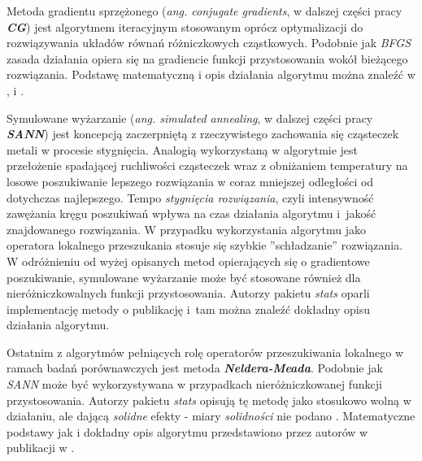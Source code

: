 \par
Metoda gradientu sprzężonego (\emph{ang. conjugate gradients}, w dalszej części pracy \emph{\textbf{CG}}) jest algorytmem iteracyjnym stosowanym oprócz optymalizacji do rozwiązywania układów równań różniczkowych cząstkowych. Podobnie jak \emph{BFGS} zasada działania opiera się na gradiencie funkcji przystosowania wokół bieżącego rozwiązania. Podstawę matematyczną i opis działania algorytmu można znaleźć w \cite{fletcher1964function}, \cite{Nash90a} i \cite{nocedal2006numerical}.
\par
Symulowane wyżarzanie (\emph{ang. simulated annealing}, w dalszej części pracy \emph{\textbf{SANN}}) jest koncepcją zaczerpniętą z rzeczywistego zachowania się cząsteczek metali w procesie stygnięcia. Analogią wykorzystaną w algorytmie jest przełożenie spadającej ruchliwości cząsteczek wraz z obniżaniem temperatury na losowe poszukiwanie lepszego rozwiązania w coraz mniejszej odległości od dotychczas najlepszego. Tempo \emph{stygnięcia rozwiązania}, czyli intensywność zawężania kręgu poszukiwań wpływa na czas działania algorytmu i~jakość znajdowanego rozwiązania. W przypadku wykorzystania algorytmu jako operatora lokalnego przeszukania stosuje się szybkie ''schładzanie'' rozwiązania. W odróżnieniu od wyżej opisanych metod opierających się o gradientowe poszukiwanie, symulowane wyżarzanie może być stosowane również dla nieróżniczkowalnych funkcji przystosowania. Autorzy pakietu \emph{stats} oparli implementację metody o publikację \cite{belisle1992convergence} i~tam można znaleźć dokładny opisu działania algorytmu.
\par
Ostatnim z algorytmów pełniących rolę operatorów przeszukiwania lokalnego w ramach  badań porównawczych jest metoda \emph{\textbf{Neldera-Meada}}. Podobnie jak \emph{SANN} może być wykorzystywana w przypadkach nieróżniczkowanej funkcji przystosowania. Autorzy pakietu \emph{stats} opisują tę metodę jako stosukowo wolną w działaniu, ale dającą \emph{solidne} efekty - miary \emph{solidności} nie podano \cite{statsPackage}. Matematyczne podstawy jak i dokładny opis algorytmu przedstawiono przez autorów w publikacji w \cite{nelderMead1965}.


